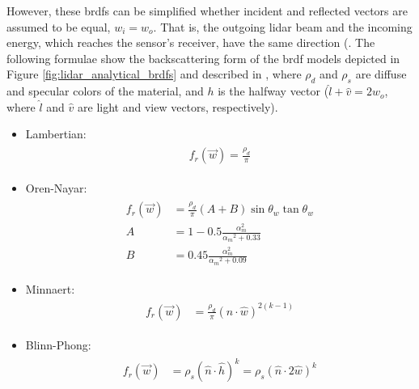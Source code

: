 However, these \acrshort{brdf}s can be simplified whether incident and reflected vectors are assumed to be equal, $w_{i} = w_{o}$. That is, the outgoing \acrshort{lidar} beam and the incoming energy, which reaches the sensor's receiver, have the same direction (. The following formulae show the backscattering form of the \acrshort{brdf} models depicted in Figure \ref{fig:lidar_analytical_brdfs} and described in \cite{montes_soldado_overview_2012, guarnera_brdf_2016}, where $\rho_{d}$ and $\rho_{s}$ are diffuse and specular colors of the material, and $h$ is the halfway vector ($\hat{l} + \hat{v} = 2w_{o}$, where $\hat{l}$ and $\hat{v}$ are light and view vectors, respectively).
\begin{itemize}
    \item Lambertian: 
    \begin{gather}
        \label{eq:lambert_brdf}
        \begin{aligned}
            f_{r}(\vec{w}) = \frac{\rho_{d}}{\pi}
        \end{aligned}
    \end{gather}
    \item Oren-Nayar: 
    \begin{gather}
        \label{eq:oren_nayar_brdf}
        \begin{aligned}
            f_{r}(\vec{w}) &= \frac{\rho_{d}}{\pi}(A + B)\sin{\theta_{w}} \tan{\theta_{w}}\\
            A &= 1 - 0.5 \frac{{\alpha_{m}^{2}}}{{\alpha_{m}}^2 + 0.33}\\
            B &= 0.45 \frac{{\alpha_{m}^{2}}}{{\alpha_{m}}^2 + 0.09}
        \end{aligned}
    \end{gather}
    \item Minnaert:
    \begin{gather}
        \label{eq:minnaert_brdf}
        \begin{aligned}
            f_{r}(\vec{w}) &= \frac{\rho_{d}}{\pi}(\hat{n} \cdot \hat{w})^{2(k-1)}
        \end{aligned}
    \end{gather}
    \item Blinn-Phong: 
    \begin{gather}
        \label{eq:blinn_phong_brdf}
        \begin{aligned}
            f_{r}(\vec{w}) &= \rho_{s}(\hat{n} \cdot \hat{h})^{k} = \rho_{s}(\hat{n} \cdot 2\hat{w})^{k}
        \end{aligned}
    \end{gather}

\end{itemize}

